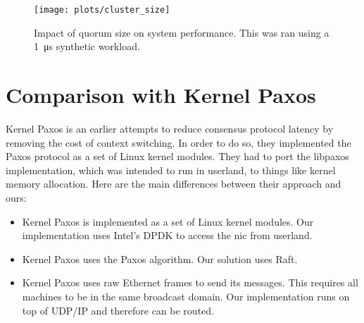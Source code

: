 \begin{figure}
    \centering
    \texttt{[image: plots/cluster\_size]}
    \caption{Impact of quorum size on system performance.
        This was ran using a \SI{1}{\micro\second} synthetic workload.
    \label{fig:cluster-size}
    }
\end{figure}


% 
% 
% 


\section{Comparison with Kernel Paxos}

Kernel Paxos\cite{kernelpaxos} is an earlier attempts to reduce consensus protocol latency by removing the cost of context switching.
In order to do so, they implemented the Paxos protocol as a set of Linux kernel modules.
They had to port the libpaxos implementation, which was intended to run in userland, to things like kernel memory allocation.
Here are the main differences between their approach and ours:

\begin{itemize}
    \item Kernel Paxos is implemented as a set of Linux kernel modules.
        Our implementation uses Intel's DPDK\cite{dpdk} to access the \gls{nic} from userland.
    \item Kernel Paxos uses the Paxos algorithm.
        Our solution uses Raft.
    \item Kernel Paxos uses raw Ethernet frames to send its messages.
        This requires all machines to be in the same broadcast domain.
        Our implementation runs on top of UDP/IP and therefore can be routed.
\end{itemize}

